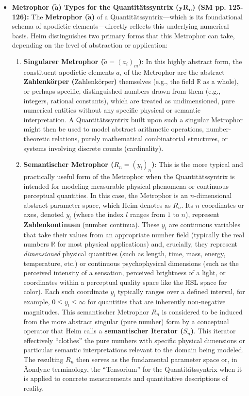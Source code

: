 \documentclass[12pt]{article}
\newcommand{\q}[1]{\enquote{#1}}
\newcommand{\metrophor}{\bm{\widetilde{a}}}
\newcommand{\quantitaetssyntrix}{\bm{yR_n}}
\newcommand{\zahlenkoerper}{\text{Zahlenkörper}}
\begin{document}
\begin{itemize}
    \item \textbf{Metrophor (\(\metrophor\)) Types for the Quantitätssyntrix (\(\quantitaetssyntrix\)) (SM pp. 125-126):}
    The \textbf{Metrophor (\( \metrophor \))} of a Quantitätssyntrix—which is its foundational schema of apodictic elements—directly reflects this underlying numerical basis. Heim distinguishes two primary forms that this Metrophor can take, depending on the level of abstraction or application:
    \begin{enumerate}
        \item \textbf{Singularer Metrophor (\( \widetilde{a} = (a_i)_m \))}: In this highly abstract form, the constituent apodictic elements \( a_i \) of the Metrophor are the abstract \textbf{Zahlenkörper (\(\zahlenkoerper\))} themselves (e.g., the field \( \mathbb{R} \) as a whole), or perhaps specific, distinguished numbers drawn from them (e.g., integers, rational constants), which are treated as undimensioned, pure numerical entities without any specific physical or semantic interpretation. A Quantitätssyntrix built upon such a singular Metrophor might then be used to model abstract arithmetic operations, number-theoretic relations, purely mathematical combinatorial structures, or systems involving discrete counts (cardinality).
        \item \textbf{Semantischer Metrophor (\( R_n = (y_l)_n \))}: This is the more typical and practically useful form of the Metrophor when the Quantitätssyntrix is intended for modeling measurable physical phenomena or continuous perceptual quantities. In this case, the Metrophor is an \( n \)-dimensional abstract parameter space, which Heim denotes as \( R_n \). Its \( n \) coordinates or axes, denoted \( y_l \) (where the index \( l \) ranges from \( 1 \) to \( n \)), represent \textbf{Zahlenkontinuen} (number continua). These \( y_l \) are continuous variables that take their values from an appropriate number field (typically the real numbers \( \mathbb{R} \) for most physical applications) and, crucially, they represent \textit{dimensioned} physical quantities (such as length, time, mass, energy, temperature, etc.) or continuous psychophysical dimensions (such as the perceived intensity of a sensation, perceived brightness of a light, or coordinates within a perceptual quality space like the HSL space for color). Each such coordinate \( y_l \) typically ranges over a defined interval, for example, \( 0 \leq y_l \leq \infty \) for quantities that are inherently non-negative magnitudes. This semantischer Metrophor \( R_n \) is considered to be induced from the more abstract singular (pure number) form by a conceptual operator that Heim calls a \textbf{semantischer Iterator (\( S_n \))}. This iterator effectively \q{clothes} the pure numbers with specific physical dimensions or particular semantic interpretations relevant to the domain being modeled. The resulting \( R_n \) then serves as the fundamental parameter space or, in Äondyne terminology, the \q{Tensorium} for the Quantitätssyntrix when it is applied to concrete measurements and quantitative descriptions of reality.
    \end{enumerate}


\end{itemize}
\end{document}
